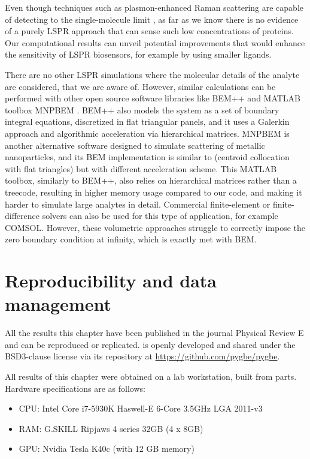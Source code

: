 Even though techniques such as plasmon-enhanced Raman 
scattering are capable of detecting to the single-molecule limit 
\cite{ZhangZhangETal2013}, as far as we know there is no evidence of a purely
LSPR approach that can sense such low concentrations of proteins. Our 
computational results can unveil potential improvements that would enhance 
the sensitivity of LSPR biosensors, for example by using smaller ligands. 

There are no other LSPR simulations where the molecular details of the analyte 
are considered, that we are aware of. However, similar calculations can be 
performed with other open source software libraries like BEM++ \cite{SmigajETal2015} and 
MATLAB toolbox MNPBEM \cite{HohenesterTrugler2012}. BEM++ also models the system
as a set of boundary integral equations, discretized in flat triangular panels, 
and it uses a Galerkin approach and algorithmic acceleration via hierarchical 
matrices. MNPBEM is another alternative software designed to simulate scattering
of metallic nanoparticles, and its BEM implementation is similar to \pygbe 
(centroid collocation with flat triangles) but with different acceleration scheme.
This MATLAB toolbox, similarly to BEM++, also relies on hierarchical matrices 
rather than a treecode, resulting in higher memory usage compared to our code, 
and making it harder to simulate large analytes in detail. 
Commercial finite-element or finite-difference solvers can also be used for this
type of application, for example COMSOL. However, these volumetric approaches 
struggle to correctly impose the zero boundary condition at infinity, which is
exactly met with BEM.  

\section{Reproducibility and data management} \label{sec:repro_lspr}

All the results  this chapter have been published in the journal 
Physical Review E \cite{ClementiETal2019} and can be reproduced or replicated. \pygbe is openly developed and 
shared under the BSD3-clause license via its repository at \url{https://github.com/pygbe/pygbe}.

All results of this chapter were obtained on a lab workstation, built from parts. Hardware specifications are as follows:

\begin{itemize}
  \item CPU: Intel Core i7-5930K Haswell-E 6-Core 3.5GHz LGA 2011-v3
  \item RAM: G.SKILL Ripjaws 4 series 32GB (4 x 8GB)
  \item GPU: Nvidia Tesla K40c (with 12 GB memory)
\end{itemize}

